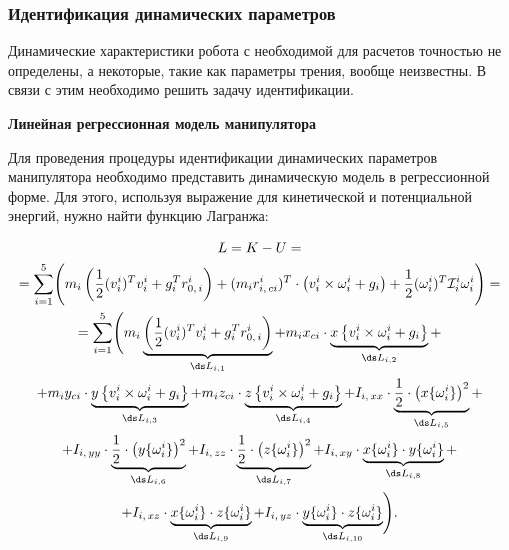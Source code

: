 \subsubsection{Идентификация динамических параметров}
Динамические характеристики робота с необходимой для расчетов точностью не определены, а некоторые, такие как параметры трения, вообще неизвестны. В связи с этим необходимо решить задачу идентификации.

\textbf{Линейная регрессионная модель манипулятора}

Для проведения процедуры идентификации динамических параметров манипулятора необходимо представить динамическую модель в регрессионной форме. Для этого, используя выражение для кинетической и потенциальной энергий, нужно найти функцию Лагранжа:

\begin{gather}
L = K - U = \notag
\\
= \sum_{i=1}^5 \Biggl( m_i \left( \frac{1}{2} (v^i_i)^T v^i_i + g_i^T r^i_{0,\,i} \right) + (m_ir^i_{i,\,ci})^T \cdot \left( v^i_i \times \omega^i_i + g_i \right) + \frac{1}{2} (\omega^i_i)^T \mathcal{I}^{i}_i \omega^i_i \Biggr) = \notag
\\
= \sum_{i=1}^5 \Biggl( m_i \underbrace{\left( \frac{1}{2} (v^i_i)^T v^i_i + g_i^T r^i_{0,\,i} \right)}_{\ds L_{i,1}} + m_i x_{ci} \cdot \underbrace{x\left\{ v^i_i \times \omega^i_i + g_i \right\}}_{\ds L_{i,2}} + \notag
\\
+ m_i y_{ci} \cdot \underbrace{y\left\{ v^i_i \times \omega^i_i + g_i \right\}}_{\ds L_{i,3}} + m_i z_{ci} \cdot \underbrace{z\left\{ v^i_i \times \omega^i_i + g_i \right\}}_{\ds L_{i,4}} + I_{i,\,xx} \cdot \underbrace{\frac{1}{2} \cdot \bigl(x\{\omega^i_i\}\bigr)^2}_{\ds L_{i,5}} +\notag
\\
+ I_{i,\,yy} \cdot \underbrace{\frac{1}{2} \cdot \bigl(y\{\omega^i_i\}\bigr)^2}_{\ds L_{i,6}} + I_{i,\,zz} \cdot \underbrace{\frac{1}{2} \cdot \bigl(z\{\omega^i_i\}\bigr)^2}_{\ds L_{i,7}} + I_{i,\,xy} \cdot \underbrace{x\{\omega^i_i\} \cdot y\{\omega^i_i\}}_{\ds L_{i,8}} +\notag
\\
+ I_{i,\,xz} \cdot \underbrace{x\{\omega^i_i\} \cdot z\{\omega^i_i\}}_{\ds L_{i,9}} + I_{i,\,yz} \cdot \underbrace{y\{\omega^i_i\} \cdot z\{\omega^i_i\}}_{\ds L_{i,10}}\Biggr) \ldotp
\end{gather}

